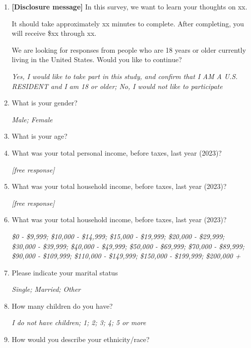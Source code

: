 \documentclass[11pt, headsepline]{article}
\begin{document}
\begin{enumerate}[resume]
    \item \textbf{[Disclosure message]}
    In this survey, we want to learn your thoughts on xx.
    
    It should take approximately xx minutes to complete. After completing, you will receive \$xx through xx.

    We are looking for responses from people who are 18 years or older currently living in the United States. Would you like to continue?
    
    \textit{Yes, I would like to take part in this study, and confirm that I AM A U.S. RESIDENT and I am 18 or older; No, I would not like to participate}

    \item What is your gender?

    \textit{Male; Female}

    \item What is your age?

    \item What was your total personal income, before taxes, last year (2023)?
    
    \textit{[free response]}

    \item What was your total household income, before taxes, last year (2023)? %

    \textit{[free response]}

    \item What was your total household income, before taxes, last year (2023)?

    \textit{\$0 - \$9,999; \$10,000 - \$14,999; \$15,000 - \$19,999; \$20,000 - \$29,999; \$30,000 - \$39,999; \$40,000 - \$49,999; \$50,000 - \$69,999; \$70,000 - \$89,999; \$90,000 - \$109,999; \$110,000 - \$149,999; \$150,000 - \$199,999; \$200,000 +}

    \item Please indicate your marital status

    \textit{Single; Married; Other}

    \item How many children do you have?

    \textit{I do not have children; 1; 2; 3; 4; 5 or more}

    \item How would you describe your ethnicity/race?


\end{enumerate}
\end{document}
